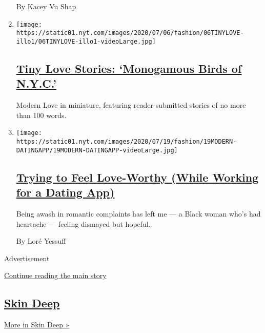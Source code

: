 \begin{enumerate}
  By Kacey Vu Shap
\item
  \texttt{[image: https://static01.nyt.com/images/2020/07/06/fashion/06TINYLOVE-illo1/06TINYLOVE-illo1-videoLarge.jpg]}

  \hypertarget{tiny-love-stories-monogamous-birds-of-nyc}{%
  \subsection{\texorpdfstring{\href{/2020/07/21/style/tiny-modern-love-stories-coronavirus-monogamous-birds-of-nyc.html}{Tiny
  Love Stories: `Monogamous Birds of
  N.Y.C.'}}{Tiny Love Stories: `Monogamous Birds of N.Y.C.'}}\label{tiny-love-stories-monogamous-birds-of-nyc}}

  Modern Love in miniature, featuring reader-submitted stories of no
  more than 100 words.
\item
  \texttt{[image: https://static01.nyt.com/images/2020/07/19/fashion/19MODERN-DATINGAPP/19MODERN-DATINGAPP-videoLarge.jpg]}

  \hypertarget{trying-to-feel-love-worthy-while-working-for-a-dating-app}{%
  \subsection{\texorpdfstring{\href{/2020/07/17/style/modern-love-feel-love-worthy-working-for-dating-app.html}{Trying
  to Feel Love-Worthy (While Working for a Dating
  App)}}{Trying to Feel Love-Worthy (While Working for a Dating App)}}\label{trying-to-feel-love-worthy-while-working-for-a-dating-app}}

  Being awash in romantic complaints has left me --- a Black woman who's
  had heartache --- feeling dismayed but hopeful.

  By Loré Yessuff
\end{enumerate}

Advertisement

\protect\hyperlink{after-mid4}{Continue reading the main story}

\hypertarget{skin-deep-1}{%
\subsection{\texorpdfstring{\href{/column/skin-deep}{Skin
Deep}}{Skin Deep}}\label{skin-deep-1}}

\href{/column/skin-deep}{More in Skin Deep »}

